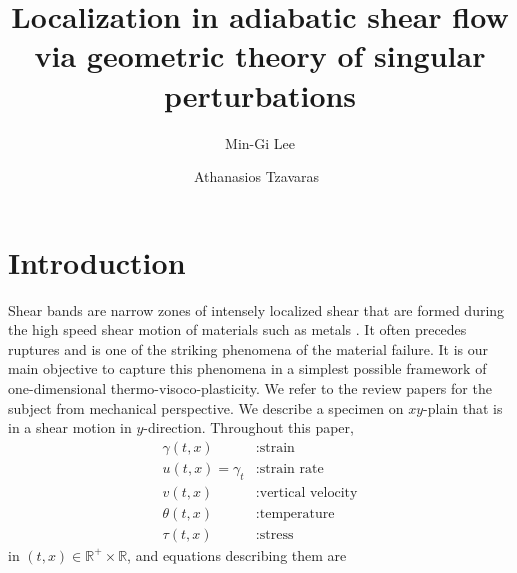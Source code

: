 \documentclass[a4paper,11pt]{article}
\begin{document}
\title{Localization in adiabatic shear flow \\via geometric theory of singular perturbations}
\author{Min-Gi Lee\footnotemark[1] \and Athanasios Tzavaras\footnotemark[1]\  \footnotemark[3]  \footnotemark[4]}
\date{}

\maketitle
\renewcommand{\thefootnote}{\fnsymbol{footnote}}
\renewcommand{\thefootnote}{\arabic{footnote}}


\maketitle

\tableofcontents

\section{Introduction}
Shear bands are narrow zones of intensely localized shear that are formed during the high speed shear motion of materials such as metals \cite{zener_effect_1944}. It often precedes ruptures and is one of the striking phenomena of the material failure. It is our main objective to capture this  phenomena in a simplest possible framework of one-dimensional thermo-visoco-plasticity. We refer to \cite{clifton_rev_1990,shawki_shear_1989,wright_survey_2002} the review papers for the subject from mechanical perspective. We describe a specimen on $xy$-plain that is in a shear motion in $y$-direction. Throughout this paper,
\begin{equation} \label{eq:vars}
\begin{aligned}
 \gamma(t,x) &: \text{strain}\\
 u(t,x)=\gamma_t &: \text{strain rate}\\
 v(t,x) &: \text{vertical velocity}\\
 \theta(t,x) &: \text{temperature}\\
 \tau(t,x) &: \text{stress}
\end{aligned}
\end{equation}
in $(t,x)\in \mathbb{R}^+ \times \mathbb{R}$, and equations describing them are
\end{document}
